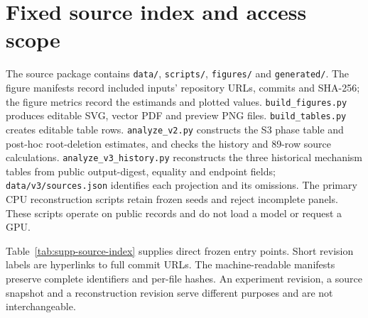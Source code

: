 \section{Fixed source index and access scope}
\label{sec:supp-sources}
The source package contains \texttt{data/}, \texttt{scripts/}, \texttt{figures/} and \texttt{generated/}. The figure manifests record included inputs' repository URLs, commits and SHA-256; the figure metrics record the estimands and plotted values. \texttt{build\_figures.py} produces editable SVG, vector PDF and preview PNG files. \texttt{build\_tables.py} creates editable table rows. \texttt{analyze\_v2.py} constructs the S3 phase table and post-hoc root-deletion estimates, and checks the history and 89-row source calculations. \texttt{analyze\_v3\_history.py} reconstructs the three historical mechanism tables from public output-digest, equality and endpoint fields; \texttt{data/v3/sources.json} identifies each projection and its omissions. The primary CPU reconstruction scripts retain frozen seeds and reject incomplete panels. These scripts operate on public records and do not load a model or request a GPU.

Table~\ref{tab:supp-source-index} supplies direct frozen entry points. Short revision labels are hyperlinks to full commit URLs. The machine-readable manifests preserve complete identifiers and per-file hashes. An experiment revision, a source snapshot and a reconstruction revision serve different purposes and are not interchangeable.

